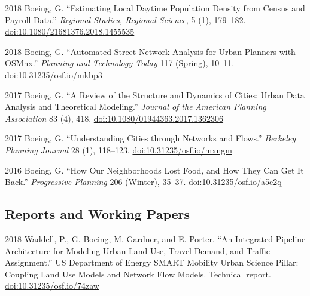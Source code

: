 \documentclass[12pt,letterpaper]{report}
\begin{document}
	\begin{tablist}
		
		\item[2018] \tab Boeing, G. \enquote{Estimating Local Daytime Population Density from Census and Payroll Data.} \textit{Regional Studies, Regional Science}, 5 (1), 179--182. \href{https://doi.org/10.1080/21681376.2018.1455535}{doi:10.1080/21681376.2018.1455535}
		
		\item[2018] \tab Boeing, G. \enquote{Automated Street Network Analysis for Urban Planners with OSMnx.} \textit{Planning and Technology Today} 117 (Spring), 10--11. \href{https://doi.org/10.31235/osf.io/mkbp3}{doi:10.31235/osf.io/mkbp3}
		
		\item[2017] \tab Boeing, G. \enquote{A Review of the Structure and Dynamics of Cities: Urban Data Analysis and Theoretical Modeling.} \textit{Journal of the American Planning Association} 83 (4), 418. \href{https://doi.org/10.1080/01944363.2017.1362306}{doi:10.1080/01944363.2017.1362306}
		
		\item[2017] \tab Boeing, G. \enquote{Understanding Cities through Networks and Flows.} \textit{Berkeley Planning Journal} 28 (1), 118--123. \href{https://doi.org/10.31235/osf.io/mxngm}{doi:10.31235/osf.io/mxngm}
		
		\item[2016] \tab Boeing, G. \enquote{How Our Neighborhoods Lost Food, and How They Can Get It Back.} \textit{Progressive Planning} 206 (Winter), 35--37. \href{https://doi.org/10.31235/osf.io/a5e2q}{doi:10.31235/osf.io/a5e2q}
		
	\end{tablist}
	
	
	
	\subsection*{Reports and Working Papers}
	
	\begin{tablist}
		
		\item[2018] \tab Waddell, P., G. Boeing, M. Gardner, and E. Porter. \enquote{An Integrated Pipeline Architecture for Modeling Urban Land Use, Travel Demand, and Traffic Assignment.} US Department of Energy SMART Mobility Urban Science Pillar: Coupling Land Use Models and Network Flow Models. Technical report. \href{https://doi.org/10.31235/osf.io/74zaw}{doi:10.31235/osf.io/74zaw}
		
	\end{tablist}
	
\end{document}
